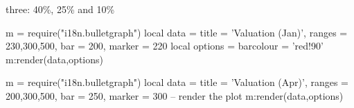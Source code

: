 three: 40\%, 25\% and 10\%

\makeatletter
\newenvironment {bulletgraph} {\luacode@begin\luacode@table@soft} {}
\makeatother



\providecommand{\bulletgauge}[4][]{
    \begin{tikzpicture}[scale=0.8, font=\arial]
    \begin{axis}[
       width=8cm,
       chartheight = 60pt,
       xtick pos=left, 
       xtick = {0,50,...,400, 450},
       ytick=\empty,
       xmin=50, xmax=450,
        tick align=outside,
        axis on top,
        every axis title/.style={
            at={(rel axis cs:0,0.5)},
            anchor=east,
            align=right,
            xshift=-0.5em
        },
        #1
    ]
    \pgfplotsinvokeforeach{#4}{
        \pgfplotsset{cycle list name=bullet}
        \addplot +[xbar, bar width=7ex ] coordinates {(##1,0)};
    }
    \addplot [fill= barcolour, xbar, barwidth ] coordinates {(#2,0)};    
    \addplot [mark=|, mark options={very thick}, mark size=2ex, ] coordinates {(#3,0)}; 
    \end{axis}
    \end{tikzpicture}
}

\begin{scriptexample}{}{}
\begin{bulletgraph}
  m = require("i18n.bulletgraph")
 local data = {
     title = 'Valuation (Jan)',
     ranges = {230,300,500},
     bar = 200,
     marker = 220}
     local options = {
        barcolour = 'red!90'
   } 
m:render(data,options)        
\end{bulletgraph}
\medskip

\begin{bulletgraph}
   m = require("i18n.bulletgraph")
   local data = {
      title = 'Valuation (Apr)',
      ranges = {200,300,500},
      bar = 250,
      marker = 300}
   -- render the plot
   m:render(data,options)           
\end{bulletgraph}
\end{scriptexample}

